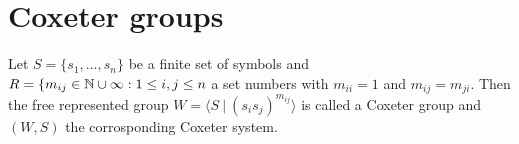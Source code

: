\section{Coxeter groups}

\begin{defi}
	\label{coxeter-system}
	Let $S = \{ s_1, \ldots, s_n \}$ be a finite set of symbols and $R = \{ m_{ij} \in \mathbb{N} \cup \infty : 1 \leq i,j \leq n$ a set numbers with $m_{ii} = 1$ and $m_{ij} = m_{ji}$. Then the free represented group $W = \langle S \ | \ (s_i s_j)^{m_{ij}} \rangle$ is called a Coxeter group and $(W,S)$ the corrosponding Coxeter system.
\end{defi}